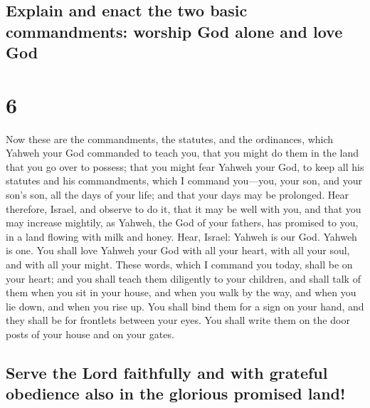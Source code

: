 \hypertarget{explain-and-enact-the-two-basic-commandments-worship-god-alone-and-love-god}{%
\subsection{Explain and enact the two basic commandments: worship God
alone and love
God}\label{explain-and-enact-the-two-basic-commandments-worship-god-alone-and-love-god}}

\hypertarget{section-5}{%
\section{6}\label{section-5}}

 Now these are the commandments, the statutes, and the
ordinances, which Yahweh your God commanded to teach you, that you might
do them in the land that you go over to possess;  that you
might fear Yahweh your God, to keep all his statutes and his
commandments, which I command you---you, your son, and your son's son,
all the days of your life; and that your days may be prolonged.
 Hear therefore, Israel, and observe to do it, that it may
be well with you, and that you may increase mightily, as Yahweh, the God
of your fathers, has promised to you, in a land flowing with milk and
honey.  Hear, Israel: Yahweh is our God. Yahweh is one.
 You shall love Yahweh your God with all your heart, with
all your soul, and with all your might.  These words,
which I command you today, shall be on your heart;  and
you shall teach them diligently to your children, and shall talk of them
when you sit in your house, and when you walk by the way, and when you
lie down, and when you rise up.  You shall bind them for a
sign on your hand, and they shall be for frontlets between your eyes.
 You shall write them on the door posts of your house and
on your gates.

\hypertarget{serve-the-lord-faithfully-and-with-grateful-obedience-also-in-the-glorious-promised-land}{%
\subsection{Serve the Lord faithfully and with grateful obedience also
in the glorious promised
land!}\label{serve-the-lord-faithfully-and-with-grateful-obedience-also-in-the-glorious-promised-land}}

